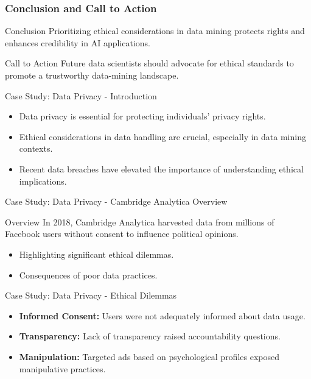 \documentclass[aspectratio=169]{beamer}
\begin{document}
\begin{frame}[fragile]
    \frametitle{Conclusion and Call to Action}
    \begin{block}{Conclusion}
        Prioritizing ethical considerations in data mining protects rights and enhances credibility in AI applications.
    \end{block}
    \begin{block}{Call to Action}
        Future data scientists should advocate for ethical standards to promote a trustworthy data-mining landscape.
    \end{block}
\end{frame}

\begin{frame}[fragile]{Case Study: Data Privacy - Introduction}
    \begin{itemize}
        \item Data privacy is essential for protecting individuals' privacy rights.
        \item Ethical considerations in data handling are crucial, especially in data mining contexts.
        \item Recent data breaches have elevated the importance of understanding ethical implications.
    \end{itemize}
\end{frame}

\begin{frame}[fragile]{Case Study: Data Privacy - Cambridge Analytica Overview}
    \begin{block}{Overview}
        In 2018, Cambridge Analytica harvested data from millions of Facebook users without consent to influence political opinions.
    \end{block}
    \begin{itemize}
        \item Highlighting significant ethical dilemmas.
        \item Consequences of poor data practices.
    \end{itemize}
\end{frame}

\begin{frame}[fragile]{Case Study: Data Privacy - Ethical Dilemmas}
    \begin{itemize}
        \item \textbf{Informed Consent:} Users were not adequately informed about data usage.
        \item \textbf{Transparency:} Lack of transparency raised accountability questions.
        \item \textbf{Manipulation:} Targeted ads based on psychological profiles exposed manipulative practices.
    \end{itemize}
\end{frame}
\end{document}
